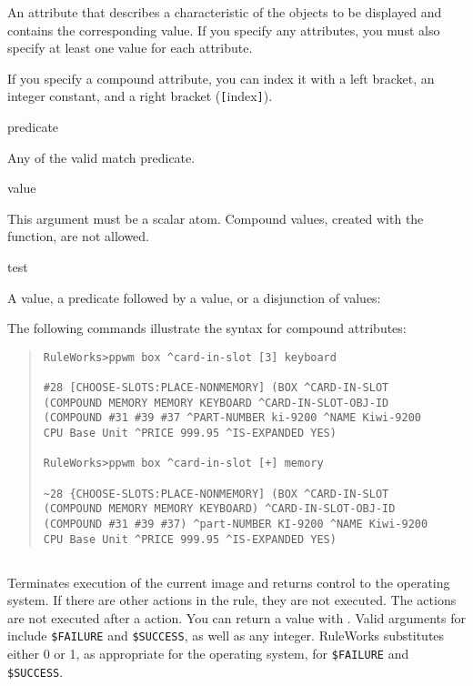 {{\begin{arguments}
  An attribute that describes a characteristic of the objects to be
  displayed and contains the corresponding value. If you specify any
  attributes, you must also specify at least one value for each
  attribute.

  If you specify a compound attribute, you can index it with a left
  bracket, an integer constant, and a right bracket
  (\verb|[|index\verb|]|).

\item[predicate]

  Any of the valid match predicate.

\item[value]

  This argument must be a scalar atom. Compound values, created with
  the  function, are not allowed.

\item[test]

  A value, a predicate followed by a value, or a disjunction of
  values:
\end{arguments}

\Example

The following commands illustrate the syntax for compound
attributes:
\begin{quote}
\begin{verbatim}
RuleWorks>ppwm box ^card-in-slot [3] keyboard

#28 [CHOOSE-SLOTS:PLACE-NONMEMORY] (BOX ^CARD-IN-SLOT
(COMPOUND MEMORY MEMORY KEYBOARD ^CARD-IN-SLOT-OBJ-ID
(COMPOUND #31 #39 #37 ^PART-NUMBER ki-9200 ^NAME Kiwi-9200
CPU Base Unit ^PRICE 999.95 ^IS-EXPANDED YES)

RuleWorks>ppwm box ^card-in-slot [+] memory

~28 {CHOOSE-SLOTS:PLACE-NONMEMORY] (BOX ^CARD-IN-SLOT
(COMPOUND MEMORY MEMORY KEYBOARD) ^CARD-IN-SLOT-OBJ-ID
(COMPOUND #31 #39 #37) ^part-NUMBER KI-9200 ^NAME Kiwi-9200
CPU Base Unit ^PRICE 999.95 ^IS-EXPANDED YES)
\end{verbatim}
\end{quote}

\subsection{}

Terminates execution of the current image and returns control to the
operating system. If there are other actions in the rule, they are not
executed. The  actions are not executed after a 
action. You can return a value with . Valid arguments for
 include \verb|$FAILURE| and \verb|$SUCCESS|, as well as any
integer. RuleWorks substitutes either 0 or 1, as appropriate for the
operating system, for \verb|$FAILURE| and \verb|$SUCCESS|.

}}
